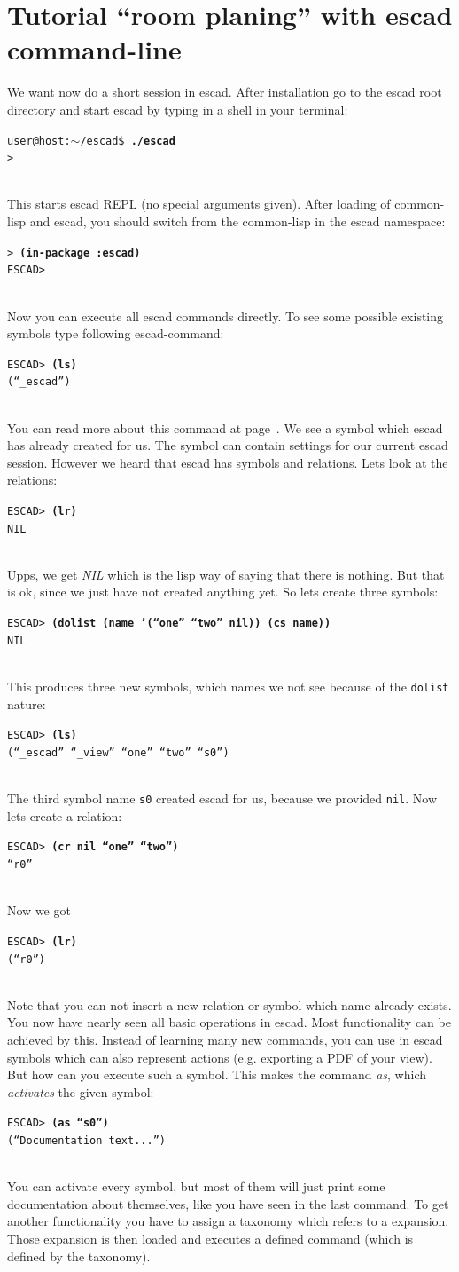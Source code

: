 \documentclass[a4paper, 12pt, openany]{scrbook}
\makeatletter
\newcommand{\shellcmdline}[2]{\\
  \setlength{\fboxsep}{2pt}\colorbox{black!20}{\parbox{\textwidth}{\texttt{user@host:$\sim$/escad\$ \textbf{#1}\\#2}}}\\}
\newcommand{\escadcmdline}[2]{\\\setlength{\fboxsep}{2pt}\colorbox{black!20}{\parbox{\textwidth}{\texttt{ESCAD> \textbf{#1}\\#2}}}\\}
\newcommand{\lispcmdline}[2]{\\\setlength{\fboxsep}{2pt}\colorbox{black!20}{\parbox{\textwidth}{\texttt{> \textbf{#1}\\#2}}}\\}
\makeatother
\begin{document}
\section{Tutorial ``room planing'' with escad command-line}
We want now do a short session in escad. After installation go to the escad root directory and start escad by typing in a shell in your terminal:
\shellcmdline{./escad}{>}
This starts escad REPL (no special arguments given). After loading of common-lisp and escad, you should switch from the common-lisp in the escad namespace:
\lispcmdline{(in-package :escad)}{ESCAD>}
Now you can execute all escad commands directly. To see some possible existing symbols type following escad-command:
\escadcmdline{(ls)}{(``\_escad'')}\label{ex:ls}
You can read more about this command at page~\pageref{it:ls}. We see a symbol which escad has already created for us. The symbol can contain settings for our current escad session.
However we heard that escad has symbols and relations. Lets look at the relations:
\escadcmdline{(lr)}{NIL}\label{ex:lr}
Upps, we get \emph{NIL} which is the lisp way of saying that there is nothing. But that is ok, since we just have not created anything yet. So lets create three symbols:
\escadcmdline{(dolist (name '(``one'' ``two'' nil)) (cs name))}{NIL}\label{ex:cs}
This produces three new symbols, which names we not see because of the \texttt{dolist} nature:
\escadcmdline{(ls)}{(``\_escad'' ``\_view'' ``one'' ``two'' ``s0'')}
The third symbol name \texttt{s0} created escad for us, because we provided \texttt{nil}.
Now lets create a relation:
\escadcmdline{(cr nil ``one'' ``two'')}{``r0''}\label{ex:cr}
Now we got
\escadcmdline{(lr)}{(``r0'')}
Note that you can not insert a new relation or symbol which name already exists.
You now have nearly seen all basic operations in escad. Most functionality can be achieved by this. Instead of learning many new commands, you can use in escad symbols which can also represent actions (e.g. exporting a PDF of your view). But how can you execute such a symbol. This makes the command \emph{as}, which \emph{activates} the given symbol:
\escadcmdline{(as ``s0'')}{(``Documentation text...'')}
You can activate every symbol, but most of them will just print some documentation about themselves, like you have seen in the last command. To get another functionality you have to assign a taxonomy which refers to a expansion. Those expansion is then loaded and executes a defined command (which is defined by the taxonomy).
\end{document}
